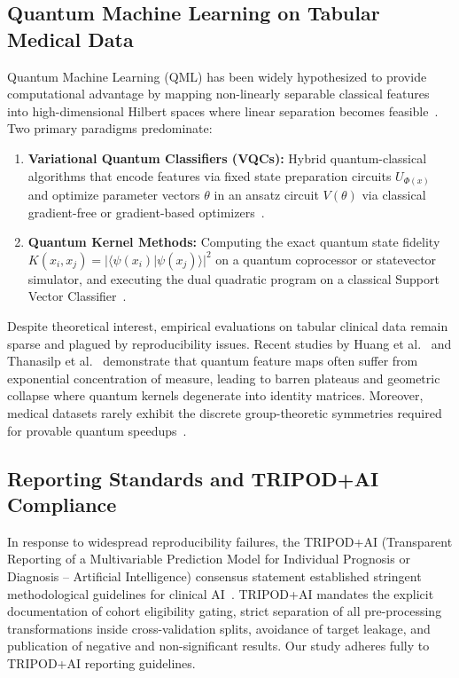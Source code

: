 \documentclass[conference]{IEEEtran}
\begin{document}
\subsection{Quantum Machine Learning on Tabular Medical Data}
Quantum Machine Learning (QML) has been widely hypothesized to provide computational advantage by mapping non-linearly separable classical features into high-dimensional Hilbert spaces where linear separation becomes feasible~\cite{havlicek2019supervised, schuld2019quantum}. Two primary paradigms predominate:
\begin{enumerate}
    \item \textbf{Variational Quantum Classifiers (VQCs):} Hybrid quantum-classical algorithms that encode features via fixed state preparation circuits $U_{\Phi(x)}$ and optimize parameter vectors $\theta$ in an ansatz circuit $V(\theta)$ via classical gradient-free or gradient-based optimizers~\cite{cerezo2021variational}.
    \item \textbf{Quantum Kernel Methods:} Computing the exact quantum state fidelity $K(x_i, x_j) = |\langle \psi(x_i) | \psi(x_j) \rangle|^2$ on a quantum coprocessor or statevector simulator, and executing the dual quadratic program on a classical Support Vector Classifier~\cite{schuld2021quantum}.
\end{enumerate}

Despite theoretical interest, empirical evaluations on tabular clinical data remain sparse and plagued by reproducibility issues. Recent studies by Huang et al.~\cite{huang2021power} and Thanasilp et al.~\cite{thanasilp2022exponential} demonstrate that quantum feature maps often suffer from exponential concentration of measure, leading to barren plateaus and geometric collapse where quantum kernels degenerate into identity matrices. Moreover, medical datasets rarely exhibit the discrete group-theoretic symmetries required for provable quantum speedups~\cite{preskill2018quantum}.

\subsection{Reporting Standards and TRIPOD+AI Compliance}
In response to widespread reproducibility failures, the TRIPOD+AI (Transparent Reporting of a Multivariable Prediction Model for Individual Prognosis or Diagnosis -- Artificial Intelligence) consensus statement established stringent methodological guidelines for clinical AI~\cite{collins2024tripod}. TRIPOD+AI mandates the explicit documentation of cohort eligibility gating, strict separation of all pre-processing transformations inside cross-validation splits, avoidance of target leakage, and publication of negative and non-significant results. Our study adheres fully to TRIPOD+AI reporting guidelines.
\end{document}
